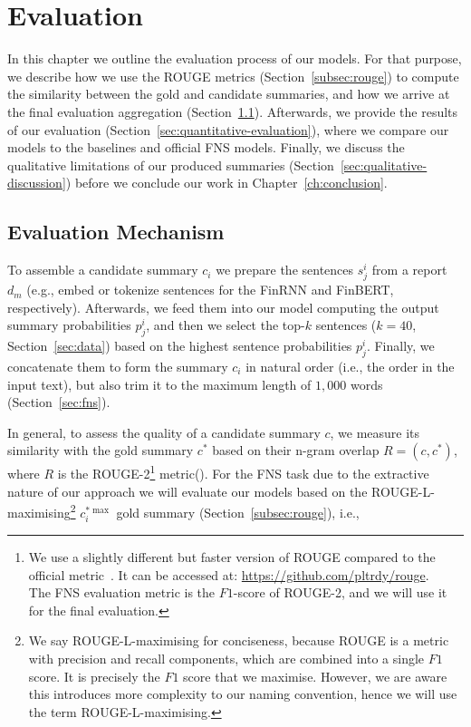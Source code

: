 \chapter{Evaluation}\label{ch:evaluation}
In this chapter we outline the evaluation process of our models.
For that purpose, we describe how we use the ROUGE metrics (Section~\ref{subsec:rouge}) to compute the
similarity between the gold and candidate summaries, and how we arrive at the final evaluation aggregation (Section~\ref{sec:evaluation-mechanism}).
Afterwards, we provide the results of our evaluation (Section~\ref{sec:quantitative-evaluation}), where we compare our models to the baselines and official FNS models.
Finally, we discuss the qualitative limitations of our produced summaries (Section~\ref{sec:qualitative-discussion}) before we conclude our work in Chapter~\ref{ch:conclusion}.

\section{Evaluation Mechanism}\label{sec:evaluation-mechanism}
To assemble a candidate summary $c_{i}$ we prepare the sentences $s_{j}^{i}$ from a report $d_{m}$ (e.g., embed or tokenize sentences for the FinRNN and FinBERT, respectively).
Afterwards, we feed them into our model computing the output summary probabilities $p_{j}^{i}$, and then we select the
top-$k$ sentences ($k=40$, Section~\ref{sec:data}) based on the highest sentence probabilities $p_{j}^{i}$.
Finally, we concatenate them to form the summary $c_{i}$ in natural order (i.e., the order in the input text),
but also trim it to the maximum length of $1,000$ words (Section~\ref{sec:fns}).

In general, to assess the quality of a candidate summary $c$, we measure its similarity with the gold summary $c^{*}$
based on their n-gram overlap $R=(c, c^{*})$, where $R$ is the ROUGE-2\footnote{
        We use a slightly different but faster version of ROUGE compared to the official metric~\cite{lin2004rouge}.
        It can be accessed at: \url{https://github.com/pltrdy/rouge}. \\
        The FNS evaluation metric is the $F1$-score of ROUGE-2, and we will use it for the final evaluation.
} metric(\cite{lin2004rouge}).
For the FNS task due to the extractive nature of our approach we will evaluate our models based on
the ROUGE-L-maximising\footnote{
    We say ROUGE-L-maximising for conciseness, because ROUGE is a metric with precision and recall components, which are combined into a single $F1$ score.
    It is precisely the $F1$ score that we maximise.
    However, we are aware this introduces more complexity to our naming convention, hence we will use the term ROUGE-L-maximising.
} $c^{*\max}_{i}$ gold summary (Section~\ref{subsec:rouge}), i.e.,

